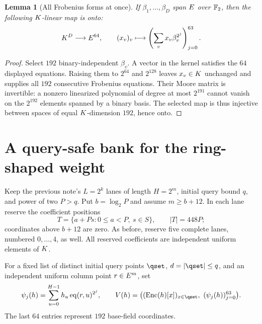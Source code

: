 \documentclass[11pt]{article}
\newtheorem{lemma}{Lemma}
\begin{document}
\begin{lemma}[All Frobenius forms at once]\label{lem:moore}
If $\beta_1,\ldots,\beta_D$ span $E$ over $\mathbb{F}_2$, then the following $K$-linear map is onto:
\[
 K^D\longrightarrow E^{64},\qquad
 (x_v)_v\longmapsto\left(\sum_v x_v\beta_v^{2^j}\right)_{j=0}^{63}.
\]
\end{lemma}
\begin{proof}
Select $192$ binary-independent $\beta_v$. A vector in the kernel satisfies the $64$ displayed equations. Raising them to $2^{64}$ and $2^{128}$ leaves $x_v\in K$ unchanged and supplies all $192$ consecutive Frobenius equations. Their Moore matrix is invertible: a nonzero linearized polynomial of degree at most $2^{191}$ cannot vanish on the $2^{192}$ elements spanned by a binary basis. The selected map is thus injective between spaces of equal $K$-dimension $192$, hence onto.
\end{proof}

\section{A query-safe bank for the ring-shaped weight}

Keep the previous note's $L=2^k$ lanes of length $H=2^m$, initial query bound $q$, and power of two $P>q$. Put $b=\log_2P$ and assume $m\ge b+12$. In each lane reserve the coefficient positions
\[
 T=\{a+Ps:0\le a<P,\ s\in S\},\qquad |T|=448P;
\]
coordinates above $b+12$ are zero. As before, reserve five complete lanes, numbered $0,\ldots,4$, as well. All reserved coefficients are independent uniform elements of $K$.

For a fixed list of distinct initial query points $\qset$, $d=|\qset|\le q$, and an independent uniform column point $r\in E^m$, set
\[
 \psi_j(h)=\sum_{u=0}^{H-1}h_u\eq(r,u)^{2^j},\qquad
 V(h)=\bigl((\Enc(h)[x])_{x\in\qset},\ (\psi_j(h))_{j=0}^{63}\bigr).
\]
The last $64$ entries represent $192$ base-field coordinates.
\end{document}
